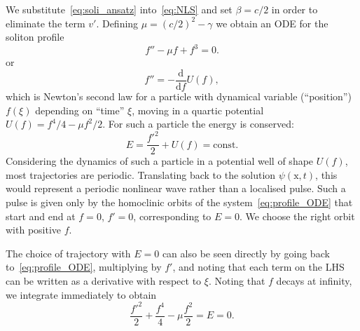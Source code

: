 \documentclass[11pt,a4paper]{article}
\begin{document}
We substitute~\eqref{eq:soli_ansatz} into~\eqref{eq:NLS} and set $\beta=c/2$ in order to eliminate the term $v'$. Defining $\mu = (c/2)^2 -\gamma$ we obtain an ODE for the soliton profile
\begin{equation}
	\label{eq:profile_ODE}
	f'' - \mu f + f^3 = 0.
\end{equation}
or
\begin{equation*}
	f'' = -\frac{\mathrm{d}}{\mathrm{d} f}U(f),
\end{equation*}
which is Newton's second law for a particle with dynamical variable (``position'') $f(\xi)$ depending on ``time'' $\xi$, moving in a quartic potential $U(f)=f^4/4-\mu f^2/2$. For such a particle the energy is conserved:
\begin{equation*}
	E = \frac{f'^2}{2} + U(f) = \mathrm{const}.
\end{equation*}
Considering the dynamics of such a particle in a potential well of shape $U(f)$, most trajectories are periodic. Translating back to the solution $\psi(\mathrm{x},t)$, this would represent a periodic nonlinear wave rather than a localised pulse. Such a pulse is given only by the homoclinic orbits of the system~\eqref{eq:profile_ODE} that start and end at $f=0$, $f'=0$, corresponding to $E=0$. We choose the right orbit with positive $f$. 

The choice of trajectory with $E=0$ can also be seen directly by going back to~\eqref{eq:profile_ODE}, multiplying by $f'$, and noting that each term on the LHS can be written as a derivative with respect to $\xi$. Noting that $f$ decays at infinity, we integrate immediately to obtain
\begin{equation}
	\label{eq:E=0}
	\frac{f'^2}{2} + \frac{f^4}{4}-\mu \frac{f^2}{2} = E = 0.
\end{equation}
\end{document}
